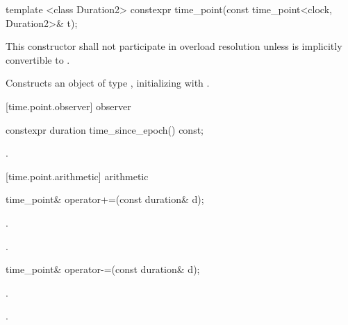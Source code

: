 %
\begin{itemdecl}
template <class Duration2>
  constexpr time_point(const time_point<clock, Duration2>& t);
\end{itemdecl}

\begin{itemdescr}
\pnum
\remarks This constructor shall not participate in overload resolution unless 
is implicitly convertible to .

\pnum
\effects Constructs an object of type , initializing
 with .
\end{itemdescr}

[time.point.observer]{ observer}

%
%
\begin{itemdecl}
constexpr duration time_since_epoch() const;
\end{itemdecl}

\begin{itemdescr}
\pnum
\returns {}.
\end{itemdescr}

[time.point.arithmetic]{ arithmetic}

%
%
\begin{itemdecl}
time_point& operator+=(const duration& d);
\end{itemdecl}

\begin{itemdescr}
\pnum
\effects {}.

\pnum
\returns {}.
\end{itemdescr}

%
%
\begin{itemdecl}
time_point& operator-=(const duration& d);
\end{itemdecl}

\begin{itemdescr}
\pnum
\effects {}.

\pnum
\returns {}.
\end{itemdescr}

